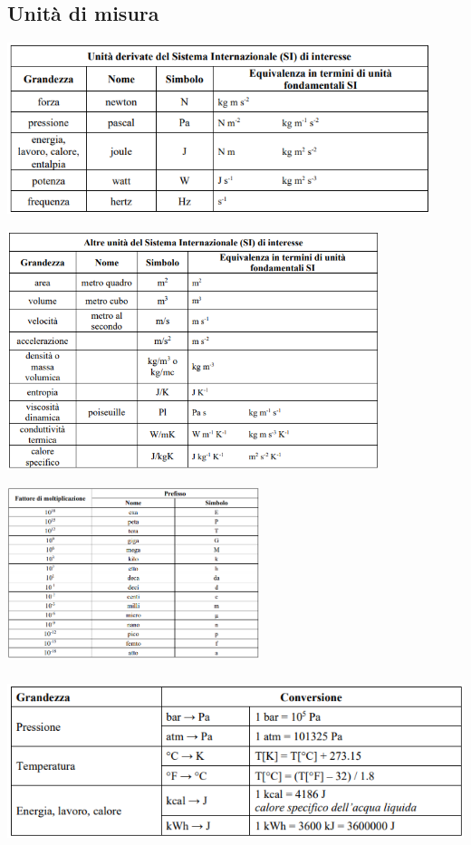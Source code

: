 \subsection{Unità di misura}
\begin{center}
    \includegraphics[height=5cm]{../L01/img10.PNG}
\end{center}
\begin{center}
    \includegraphics[height=7cm]{../L01/img11.PNG}
\end{center}
\begin{center}
    \includegraphics[height=5cm]{../L01/img12.PNG}
\end{center}
\begin{center}
    \includegraphics[height=5cm]{../L01/img13.PNG}
\end{center}
